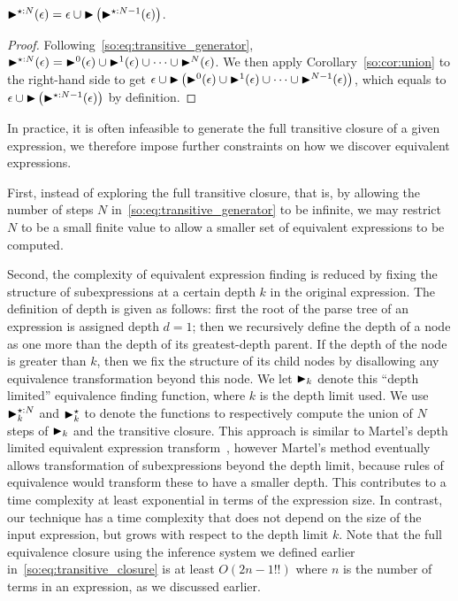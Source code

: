 \begin{lemma}
    $\operatorname{\blacktriangleright}^{\star:N}(\epsilon) = \epsilon \cup
    \operatorname{\blacktriangleright}\left(\operatorname{\blacktriangleright}^{\star:N-1}(\epsilon)\right)$.
    \label{so:lem:transitive}
\end{lemma}
\begin{proof}
    Following~\eqref{so:eq:transitive_generator}, $\operatorname{\blacktriangleright}^{\star:N}(\epsilon)
    = \operatorname{\blacktriangleright}^0(\epsilon) \cup \operatorname{\blacktriangleright}^1(\epsilon) \cup \cdots \cup
    \operatorname{\blacktriangleright}^N(\epsilon)$.  We then apply Corollary~\eqref{so:cor:union} to the
    right-hand side to get $\epsilon \cup \operatorname{\blacktriangleright}\left( \operatorname{\blacktriangleright}^0(\epsilon)
    \cup \operatorname{\blacktriangleright}^1(\epsilon) \cup \cdots \cup \operatorname{\blacktriangleright}^{N-1}(\epsilon)\right)$,
    which equals to $\epsilon \cup \operatorname{\blacktriangleright}\left( \operatorname{\blacktriangleright}^{\star:N-1}(\epsilon)
    \right)$ by definition.
\end{proof}

In practice, it is often infeasible to generate the full transitive closure of
a given expression, we therefore impose further constraints on how we discover
equivalent expressions.

First, instead of exploring the full transitive closure, that is, by allowing
the number of steps $N$ in~\eqref{so:eq:transitive_generator} to be infinite,
we may restrict $N$ to be a small finite value to allow a smaller set of
equivalent expressions to be computed.

Second, the complexity of equivalent expression finding is reduced by fixing
the structure of subexpressions at a certain depth $k$ in the original
expression.  The definition of depth is given as follows: first the root
of the parse tree of an expression is assigned depth $d = 1$; then we
recursively define the depth of a node as one more than the depth of its
greatest-depth parent.  If the depth of the node is greater than $k$, then
we fix the structure of its child nodes by disallowing any equivalence
transformation beyond this node. We let $\operatorname{\blacktriangleright}_k$ denote this ``depth
limited'' equivalence finding function, where $k$ is the depth limit used.  We
use $\operatorname{\blacktriangleright}^{\star:N}_k$ and $\operatorname{\blacktriangleright}^\star_k$ to denote the functions to
respectively compute the union of $N$ steps of $\operatorname{\blacktriangleright}_k$ and the transitive
closure. This approach is similar to Martel's depth limited equivalent
expression transform~\cite{martel07}, however Martel's method eventually allows
transformation of subexpressions beyond the depth limit, because rules of
equivalence would transform these to have a smaller depth.  This contributes
to a time complexity at least exponential in terms of the expression size. In
contrast, our technique has a time complexity that does not depend on the size
of the input expression, but grows with respect to the depth limit $k$. Note
that the full equivalence closure using the inference system we defined earlier
in~\eqref{so:eq:transitive_closure} is at least $O({2n - 1}!!)$ where $n$ is
the number of terms in an expression, as we discussed earlier.

